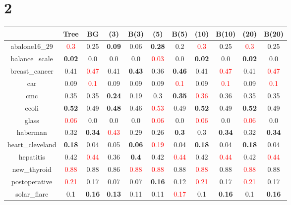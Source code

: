 \documentclass{article}%
\begin{document}
\section*{2}%
\begin{tabular}{c|cccccccccc}%
\hline%
&Tree&BG&(3)&B(3)&(5)&B(5)&(10)&B(10)&(20)&B(20)\\%
\hline%
abalone16\_29&\textcolor{red}{ 
0.3
}&0.25&\textbf{0.09}&0.06&\textbf{0.28}&0.2&\textcolor{red}{ 
0.3
}&0.25&\textcolor{red}{ 
0.3
}&0.25\\%
\hline%
balance\_scale&\textbf{0.02}&0.0&0.0&0.0&\textcolor{red}{ 
0.03
}&0.0&\textbf{0.02}&0.0&\textbf{0.02}&0.0\\%
\hline%
breast\_cancer&0.41&\textcolor{red}{ 
0.47
}&0.41&\textbf{0.43}&0.36&\textbf{0.46}&0.41&\textcolor{red}{ 
0.47
}&0.41&\textcolor{red}{ 
0.47
}\\%
\hline%
car&0.09&\textcolor{red}{ 
0.1
}&0.09&0.09&0.09&\textcolor{red}{ 
0.1
}&0.09&\textcolor{red}{ 
0.1
}&0.09&\textcolor{red}{ 
0.1
}\\%
\hline%
cmc&0.35&0.35&\textbf{0.24}&0.19&0.3&\textbf{0.35}&\textcolor{red}{ 
0.36
}&0.36&0.35&0.35\\%
\hline%
ecoli&\textbf{0.52}&0.49&\textbf{0.48}&0.46&\textcolor{red}{ 
0.53
}&0.49&\textbf{0.52}&0.49&\textbf{0.52}&0.49\\%
\hline%
glass&\textcolor{red}{ 
0.06
}&0.0&0.0&0.0&\textcolor{red}{ 
0.06
}&0.0&\textcolor{red}{ 
0.06
}&0.0&\textcolor{red}{ 
0.06
}&0.0\\%
\hline%
haberman&0.32&\textbf{0.34}&\textcolor{red}{ 
0.43
}&0.29&0.26&\textbf{0.3}&0.3&\textbf{0.34}&0.32&\textbf{0.34}\\%
\hline%
heart\_cleveland&\textbf{0.18}&0.04&0.05&\textbf{0.06}&\textcolor{red}{ 
0.19
}&0.04&\textbf{0.18}&0.04&\textbf{0.18}&0.04\\%
\hline%
hepatitis&0.42&\textcolor{red}{ 
0.44
}&0.36&\textbf{0.4}&0.42&\textcolor{red}{ 
0.44
}&0.42&\textcolor{red}{ 
0.44
}&0.42&\textcolor{red}{ 
0.44
}\\%
\hline%
new\_thyroid&\textcolor{red}{ 
0.88
}&0.88&0.86&\textcolor{red}{ 
0.88
}&\textcolor{red}{ 
0.88
}&0.88&\textcolor{red}{ 
0.88
}&0.88&\textcolor{red}{ 
0.88
}&0.88\\%
\hline%
postoperative&\textcolor{red}{ 
0.21
}&0.17&0.07&0.07&\textbf{0.16}&0.12&\textcolor{red}{ 
0.21
}&0.17&\textcolor{red}{ 
0.21
}&0.17\\%
\hline%
solar\_flare&0.1&\textbf{0.16}&\textbf{0.13}&0.11&0.11&\textcolor{red}{ 
0.17
}&0.1&\textbf{0.16}&0.1&\textbf{0.16}\\%

\end{tabular}
\end{document}
